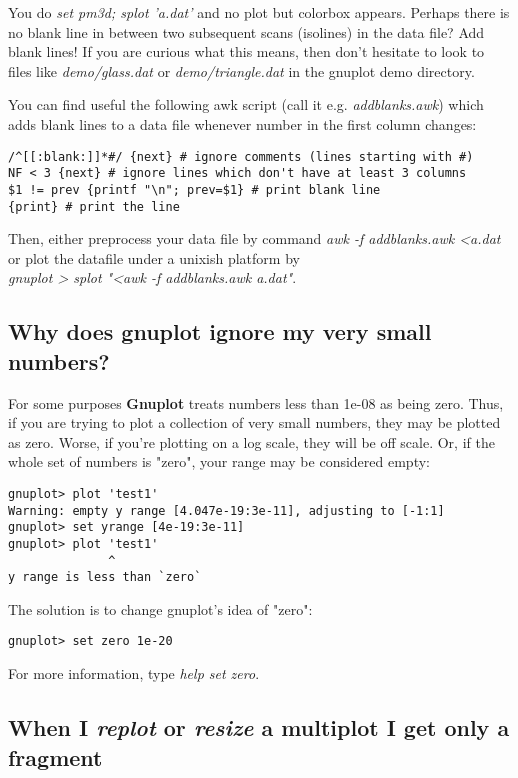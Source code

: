 \documentclass[letter,11pt]{article}
\newcommand{\gnuplot}{\textbf{gnuplot }}
\newcommand{\Gnuplot}{\textbf{Gnuplot }}
\begin{document}
{You do {\em set pm3d; splot 'a.dat'} and no plot but colorbox appears.
Perhaps there is no blank line in between two subsequent scans (isolines) in
the data file? Add blank lines! If you are curious what this means, then don't
hesitate to look to files like {\em demo/glass.dat} or {\em demo/triangle.dat}
in the gnuplot demo directory.

You can find useful the following awk script (call it e.g. {\em addblanks.awk})
which adds blank lines to a data file whenever number in the first column
changes:
\small
\begin{verbatim}
/^[[:blank:]]*#/ {next} # ignore comments (lines starting with #)
NF < 3 {next} # ignore lines which don't have at least 3 columns
$1 != prev {printf "\n"; prev=$1} # print blank line
{print} # print the line
\end{verbatim}
\normalsize

Then, either preprocess your data file by command
{\em awk -f addblanks.awk <a.dat}
or plot the datafile under a unixish platform by\\
{\em gnuplot > splot "<awk -f addblanks.awk a.dat"}.

\subsection{Why does \gnuplot ignore my very small numbers?}

For some purposes \Gnuplot{} treats numbers less than 1e-08 as being zero.
Thus, if you are trying to plot a collection of very small
numbers, they may be plotted as zero. Worse, if you're plotting
on a log scale, they will be off scale. Or, if the whole set of
numbers is "zero", your range may be considered empty:

\small
\begin{verbatim}
gnuplot> plot 'test1'
Warning: empty y range [4.047e-19:3e-11], adjusting to [-1:1]
gnuplot> set yrange [4e-19:3e-11]
gnuplot> plot 'test1'
              ^
y range is less than `zero`
\end{verbatim}
\normalsize

The solution is to change gnuplot's idea of "zero":
\small
\begin{verbatim}
gnuplot> set zero 1e-20
\end{verbatim}
\normalsize

For more information, type {\em help set zero}.

\subsection{When I {\em replot} or {\em resize} a multiplot I get only a fragment}

}
\end{document}
